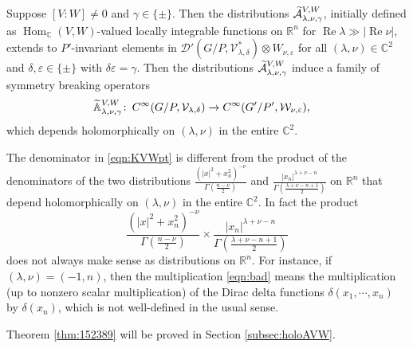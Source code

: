 \begin{theorem}
\label{thm:152389}
Suppose $[V:W] \ne 0$
 and $\gamma \in \{ \pm \}$.  
Then the distributions 
 $\widetilde{{\mathcal{A}}}_{{\lambda},{\nu},{\gamma}}^{{V,W}}$, 
 initially defined
 as $\operatorname{Hom}_{\mathbb{C}}(V,W)$-valued
 locally integrable functions
 on ${\mathbb{R}}^n$
 for $\operatorname{Re} \lambda \gg |\operatorname{Re} \nu|$, 
 extends to $P'$-invariant elements in 
$
   {\mathcal{D}}'(G/P, {\mathcal{V}}_{\lambda,\delta}^{\ast}) \otimes W_{\nu,\varepsilon}
$
 for all $(\lambda, \nu) \in {\mathbb{C}}^2$
 and $\delta, \varepsilon \in \{ \pm \}$
with $\delta \varepsilon = \gamma$.  
Then the distributions $\widetilde{{\mathcal{A}}}_{{\lambda},{\nu},{\gamma}}^{{V,W}}$
 induce a family of symmetry breaking operators
\begin{alignat*}{2}
{\widetilde{\mathbb{A}}}_{{\lambda},{\nu},{\gamma}}^{{V,W}}
\colon \,&C^{\infty}(G/P, {\mathcal{V}}_{\lambda,\delta})
   \to 
   C^{\infty}(G'/P', {\mathcal{W}}_{\nu,\varepsilon}), 
\end{alignat*}
which depends holomorphically on $(\lambda, \nu)$
 in the entire ${\mathbb{C}}^2$.  
\end{theorem}



\begin{remark}
The denominator in \eqref{eqn:KVWpt}
 is different from the product
 of the denominators
 of the two distributions 
$\frac{(|x|^2 + x_n^2)^{-\nu}}{\Gamma(\frac{n-\nu}{2})}$
and 
$\frac{|x_n|^{\lambda+\nu-n}}{\Gamma(\frac{\lambda+\nu-n+1}{2})}$
 on ${\mathbb{R}}^n$
 that depend holomorphically 
 on $(\lambda,\nu)$ in the entire ${\mathbb{C}}^2$.  
In fact the product
\begin{equation}
\label{eqn:bad}
\frac{(|x|^2 + x_n^2)^{-\nu}}{\Gamma(\frac{n-\nu}{2})}
\times
\frac{|x_n|^{\lambda+\nu-n}}{\Gamma(\frac{\lambda+\nu-n+1}{2})}
\end{equation}
 does not always make sense
 as distributions on ${\mathbb{R}}^n$.  
For instance, 
 if $(\lambda,\nu)=(-1,n)$, 
 then the multiplication \eqref{eqn:bad} means 
 the multiplication 
 (up to nonzero scalar multiplication)
 of the Dirac delta functions
 $\delta(x_1, \cdots,x_n)$ 
 by $\delta(x_n)$, 
 which is not well-defined in the usual sense.  
\end{remark}



Theorem \ref{thm:152389} will be proved in Section \ref{subsec:holoAVW}.  



